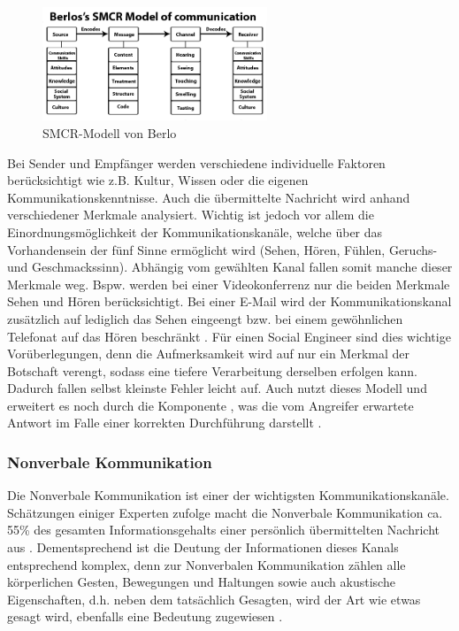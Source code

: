 \begin{figure}[htbp]
	\centering
	\includegraphics[width=0.6\textwidth]{abb/berlos-smcr-model.jpg}
	\caption{SMCR-Modell von Berlo}
	\label{fig:smcr-model-berlo}
\end{figure}

Bei Sender und Empfänger werden verschiedene individuelle Faktoren berücksichtigt wie z.B. Kultur, Wissen oder die eigenen Kommunikationskenntnisse.
Auch die übermittelte Nachricht wird anhand verschiedener Merkmale analysiert.
Wichtig ist jedoch vor allem die Einordnungsmöglichkeit der Kommunikationskanäle, welche über das Vorhandensein der fünf Sinne ermöglicht wird (Sehen, Hören, Fühlen, Geruchs- und Geschmackssinn).
Abhängig vom gewählten Kanal fallen somit manche dieser Merkmale weg.
Bspw. werden bei einer Videokonferrenz nur die beiden Merkmale Sehen und Hören berücksichtigt.
Bei einer E-Mail wird der Kommunikationskanal zusätzlich auf lediglich das Sehen eingeengt bzw. bei einem gewöhnlichen Telefonat auf das Hören beschränkt \citep{human-hacking}.
Für einen Social Engineer sind dies wichtige Vorüberlegungen, denn die Aufmerksamkeit wird auf nur ein Merkmal der Botschaft verengt, sodass eine tiefere Verarbeitung derselben erfolgen kann.
Dadurch fallen selbst kleinste Fehler leicht auf.
Auch  nutzt dieses Modell und erweitert es noch durch die Komponente , was die vom Angreifer erwartete Antwort im Falle einer korrekten Durchführung darstellt \citep{human-hacking}.

\subsubsection{Nonverbale Kommunikation}\label{sec:nonverbale-kommunikation}

Die Nonverbale Kommunikation ist einer der wichtigsten Kommunikationskanäle.
Schätzungen einiger Experten zufolge macht die Nonverbale Kommunikation ca. 55\% des gesamten Informationsgehalts einer persönlich übermittelten Nachricht aus \citep[S. 4]{tu-dresden}.
Dementsprechend ist die Deutung der Informationen dieses Kanals entsprechend komplex, denn zur Nonverbalen Kommunikation zählen alle körperlichen Gesten, Bewegungen und Haltungen sowie auch akustische Eigenschaften, d.h. neben dem tatsächlich Gesagten, wird der Art wie etwas gesagt wird, ebenfalls eine Bedeutung zugewiesen \citep{hadnagy}.

